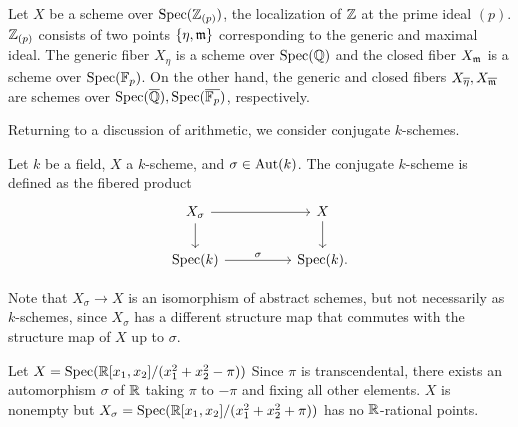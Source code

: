 \begin{example}
    Let $X$ be a scheme over $\operatorname{Spec}(\mathbb{Z}_{(p)})$, the localization of $\mathbb{Z}$ at the prime ideal $(p)$. $\mathbb{Z}_{(p)}$ consists of two points $\{\eta,\mathfrak{m}\}$ corresponding to the generic and maximal ideal. The generic fiber $X_{\eta}$ is a scheme over $\operatorname{Spec}(\mathbb{Q})$ and the closed fiber $X_{\mathfrak{m}}$ is a scheme over $\operatorname{Spec}(\mathbb{F}_{p})$. On the other hand, the generic and closed fibers $X_{\overline{\eta}},X_{\overline{\mathfrak{m}}}$ are schemes over $\operatorname{Spec}(\overline{\mathbb{Q}}),\operatorname{Spec}(\overline{\mathbb{F}_{p}})$, respectively. 
\end{example}
Returning to a discussion of arithmetic, we consider conjugate $k$-schemes. 
\begin{definition}\label{def: conjugate k-schemes}
    Let $k$ be a field, $X$ a $k$-scheme, and $\sigma\in\mathrm{Aut}(k)$. The conjugate $k$-scheme is defined as the fibered product 
    $$%
    \begin{tikzcd}
        {X_{\sigma}} && X \\
        {\spec(k)} && {\spec(k).}
        \arrow[from=1-1, to=1-3]
        \arrow[from=1-1, to=2-1]
        \arrow[from=1-3, to=2-3]
        \arrow["\sigma", from=2-1, to=2-3]
    \end{tikzcd}$$
\end{definition}
Note that $X_{\sigma}\to X$ is an isomorphism of abstract schemes, but not necessarily as $k$-schemes, since $X_{\sigma}$ has a different structure map that commutes with the structure map of $X$ up to $\sigma$. 
\begin{example}
    Let $X=\operatorname{Spec}(\mathbb{R}[x_{1},x_{2}]/(x_{1}^{2}+x_{2}^{2}-\pi))$ Since $\pi$ is transcendental, there exists an automorphism $\sigma$ of $\mathbb{R}$ taking $\pi$ to $-\pi$ and fixing all other elements. $X$ is nonempty but $X_{\sigma}=\operatorname{Spec}(\mathbb{R}[x_{1},x_{2}]/(x_{1}^{2}+x_{2}^{2}+\pi))$ has no $\mathbb{R}$-rational points. 
\end{example}